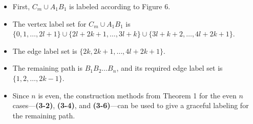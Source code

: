 \documentclass[fleqn,svgnames,screen,acmsmall]{ml2rcn}
\begin{document}
\begin{description}
  \begin{itemize}
    \item
      First, \(C_{m} \cup A_{1}B_{1}\) is labeled according to Figure 6.
    \item
      The vertex label set for \(C_{m} \cup A_{1}B_{1}\) is
      \(\{0, 1, \ldots, 2l+1\} \cup \{2l+2k+1, \ldots, 3l+k\} \cup \{3l+k+2, \ldots, 4l+2k+1\}\).
    \item
      The edge label set is \(\{2k, 2k+1, \ldots, 4l+2k+1\}\).
    \item
      The remaining path is \(B_{1}B_{2} \ldots B_{n}\), and its
      required edge label set is \(\{1, 2, \ldots, 2k-1\}\).
    \item
      Since \(n\) is even, the construction methods from Theorem 1 for
      the even \(n\) cases---\textbf{(3-2)}, \textbf{(3-4)}, and
      \textbf{(3-6)}---can be used to give a graceful labeling for the
      remaining path.
    \end{itemize}
    \vspace{0.5\baselineskip}
    
  \end{description}





\end{document}
